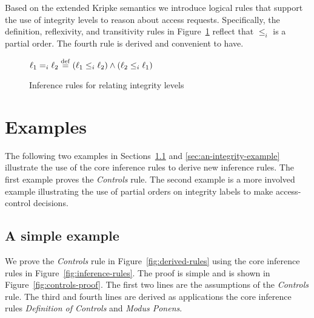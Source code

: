 Based on the extended Kripke semantics we introduce logical rules that
support the use of integrity levels to reason about access requests.
Specifically, the definition, reflexivity, and transitivity rules in
Figure~\ref{fig:integrity-level-rules} reflect that $\leq_i$ is a
partial order. The fourth rule is derived and convenient to have.

\begin{figure}[t]
  \centering
\begin{small}
  $\ell_1 =_i \ell_2 \stackrel{\mathrm{def}}{=} (\ell_1 \leq_i \ell_2) \wedge (\ell_2 \leq_i
  \ell_1)$ \vspace*{1em} 
  
   \vspace*{1em} 

    \vspace*{1em}

\end{small}
  \caption{Inference rules for relating integrity levels}
  \label{fig:integrity-level-rules}
\end{figure}

\section{Examples}
\label{sec:examples}

The following two examples in Sections~\ref{sec:simple-example} and
\ref{sec:an-integrity-example} illustrate the use of the core
inference rules to derive new inference rules. The first example
proves the \emph{Controls} rule. The second example is a more involved
example illustrating the use of partial orders on integrity labels to
make access-control decisions.

\subsection{A simple example}
\label{sec:simple-example}

We prove the \emph{Controls} rule in Figure~\ref{fig:derived-rules}
using the core inference rules in
Figure~\ref{fig:inference-rules}. The proof is simple and is shown in
Figure~\ref{fig:controls-proof}.  The first two lines are the
assumptions of the \emph{Controls} rule. The third and fourth lines
are derived as applications the core inference rules \emph{Definition
  of Controls} and \emph{Modus Ponens}.

